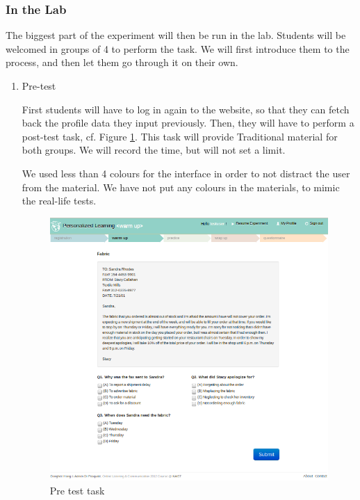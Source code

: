 \documentclass[a4paper,12pt]{article}
\makeatletter
\def\maxwidth{%
  \ifdim\Gin@nat@width>\linewidth
    \linewidth
  \else
    \Gin@nat@width
  \fi
}
\makeatother
\begin{document}
\subsubsection{In the Lab}

The biggest part of the experiment will then be run in the lab. Students will be welcomed in groups of 4 to perform the task. We will first introduce them to the process, and then let them go through it on their own.

\begin{enumerate}

\item Pre-test

First students will have to log in again to the website, so that they can fetch back the profile data they input previously. Then, they will have to perform a post-test task, cf. Figure \ref{pre_test}. This task will provide Traditional material for both groups. We will record the time, but will not set a limit.

We used less than 4 colours for the interface in order to not distract the user from the material. We have not put any colours in the materials, to mimic the real-life tests.

\begin{figure}
\begin{center}
\includegraphics[width=\maxwidth]{pre_task.png}
\caption{Pre test task}
\label{pre_test}
\end{center}
\end{figure}


\end{enumerate}
\end{document}
